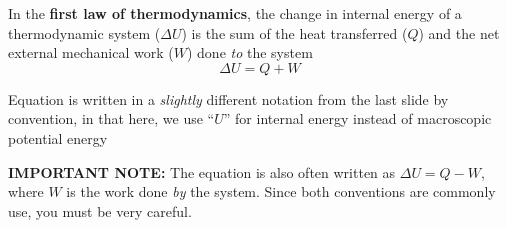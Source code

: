 %  
%
%
%
%
%
%
\begin{definition}
  In the \textbf{first law of thermodynamics}, the change in internal energy of
  a thermodynamic system ($\Delta U$) is the sum of the heat transferred ($Q$)
  and the net external mechanical work ($W$) done \emph{to} the system
  \begin{equation}
    \boxed{
      \Delta U=Q+W
    }
  \end{equation}
\end{definition}


\begin{remark}
  Equation is written in a \emph{slightly} different notation from the last
  slide by convention, in that here, we use ``$U$'' for internal energy instead
  of macroscopic potential energy
\end{remark}

\begin{remark}
  \textbf{IMPORTANT NOTE:} The equation is also often written as
  $\Delta U=Q-W$, where $W$ is the work done \emph{by} the system. Since both
  conventions are commonly use, you must be very careful.
\end{remark}



